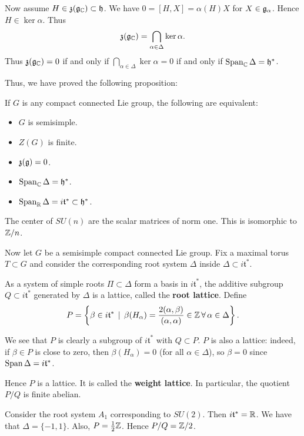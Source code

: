\documentclass[11pt, english]{article}
\begin{document}
Now assume $H \in \mathfrak z(\mathfrak g_{\mathbb{C}}) \subset \mathfrak h$. We have $0=[H,X]=\alpha(H)X$ for $X \in \mathfrak g_\alpha$. Hence $H \in \ker \alpha$. Thus
$$
\mathfrak z(\mathfrak g_{\mathbb{C}}) = \bigcap_{\alpha \in \Delta} \ker \alpha.
$$
Thus $\mathfrak z(\mathfrak g_{\mathbb{C}}) = 0$ if and only if $\bigcap_{\alpha \in \Delta} \ker \alpha = 0$ if and only if $\operatorname{Span}_{\mathbb{C}} \Delta = \mathfrak h^\ast$.

Thus, we have proved the following proposition:

\begin{prop}
 If $G$ is any compact connected Lie group, the following are equivalent:
 \begin{itemize}
 \item $G$ is semisimple.
\item $Z(G)$ is finite.
\item $\mathfrak z(\mathfrak g) = 0$.
\item $\operatorname{Span}_{\mathbb{C}} \Delta = \mathfrak h ^\ast$.
\item $\operatorname{Span}_{\mathbb{R}} \Delta = i \mathfrak t^\ast \subset \mathfrak h^\ast$.
 \end{itemize}
\end{prop}

\begin{example}
 The center of $SU(n)$ are the scalar matrices of norm one. This is isomorphic to $\mathbb{Z}/n$. 
\end{example}

Now let $G$ be a semisimple compact connected Lie group. Fix a maximal torus $T \subset G$ and consider the corresponding root system $\Delta$ inside $\Delta \subset i \mathfrak t^\ast$.

As a system of simple roots $\Pi \subset \Delta$ form a basis in $i \mathfrak t^\ast$, the additive subgroup $Q \subset i \mathfrak t^\ast$ generated by $\Delta$ is a lattice, called the \textbf{root lattice}. Define
$$
P = \left\{ \beta \in i \mathfrak t^\ast \, \mid \, \beta(H_\alpha)=\frac{2(\alpha,\beta)}{(\alpha,\alpha)} \in \mathbb{Z} \, \forall \, \alpha \in \Delta \right\}.
$$

We see that $P$ is clearly a subgroup of $i \mathfrak t^\ast$ with $Q \subset P$. $P$ is also a lattice: indeed, if $\beta \in P$ is close to zero, then $\beta(H_\alpha)=0$ (for all $\alpha \in \Delta$), so $\beta=0$ since $\operatorname{Span} \Delta = i \mathfrak t ^\ast$.

Hence $P$ is a lattice. It is called the \textbf{weight lattice}. In particular, the quotient $P/Q$ is finite abelian.

\begin{example}
Consider the root system $A_1$ corresponding to $SU(2)$. Then $i \mathfrak t^\ast = \mathbb{R}$. We have that $\Delta= \{ -1, 1\}$. Also, $P= \frac 12 \mathbb{Z}$. Hence $P/Q = \mathbb{Z}/2$. 
\end{example}
\end{document}

